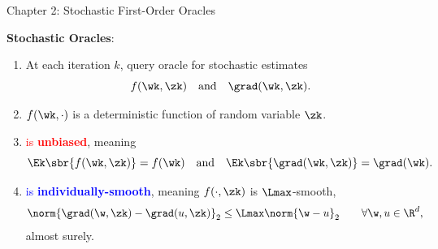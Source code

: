 \documentclass[mathserif,notheorems, hyperref={colorlinks, citecolor=blue, urlcolor=blue, linkcolor=blue}]{beamer}
\begin{document}
    \begin{frame}{Chapter 2: Stochastic First-Order Oracles}

        \textbf{Stochastic Oracles}:
        \begin{enumerate}
            \item At each iteration \( k \), query oracle \oracle{} for stochastic estimates 
                \[ f(\wk, \zk) \quad \text{and} \quad \grad(\wk, \zk). \] 
                \pause
            \item \( f(\wk, \cdot) \) is a deterministic function of random variable \( \zk \). 
                \pause
                \vspace{1ex}
            \item \textcolor{red}{\oracle{} is \textbf{unbiased}}, meaning 
            \[ \Ek\sbr{f(\wk, \zk)} = f(\wk) \quad \text{and} \quad \Ek\sbr{\grad(\wk, \zk)} = \grad(\wk). \]%
            \pause%
            \vspace{-2ex}
            \item \textcolor{blue}{\oracle{} is \textbf{individually-smooth}}, meaning \( f(\cdot, \zk) \) is \( \Lmax \)-smooth, 
                \begin{align*}
                    \norm{\grad(\w, \zk) - \grad(u, \zk)}_2 &\leq \Lmax \norm{\w - u}_2 \tag*{\(\forall \w, u \in \R^d \),} 
                \end{align*}
                almost surely.
        \end{enumerate}

    \end{frame}
\end{document}

